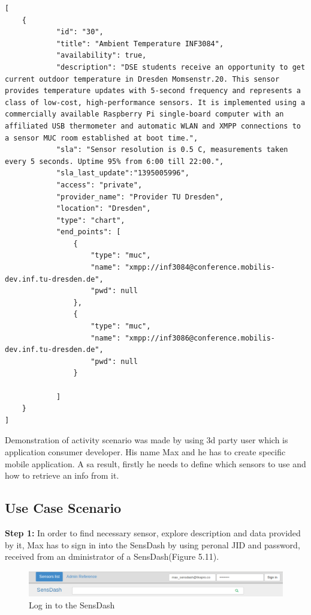 	\begin{lstlisting}[label=sensor_registry,caption=JSON Description Format]
[
    {
            "id": "30",
            "title": "Ambient Temperature INF3084",
            "availability": true,
            "description": "DSE students receive an opportunity to get current outdoor temperature in Dresden Momsenstr.20. This sensor provides temperature updates with 5-second frequency and represents a class of low-cost, high-performance sensors. It is implemented using a commercially available Raspberry Pi single-board computer with an affiliated USB thermometer and automatic WLAN and XMPP connections to a sensor MUC room established at boot time.",
            "sla": "Sensor resolution is 0.5 C, measurements taken every 5 seconds. Uptime 95% from 6:00 till 22:00.",
            "sla_last_update":"1395005996",
            "access": "private",
            "provider_name": "Provider TU Dresden",
            "location": "Dresden",            
            "type": "chart",
            "end_points": [
                {
                    "type": "muc",
                    "name": "xmpp://inf3084@conference.mobilis-dev.inf.tu-dresden.de",
                    "pwd": null
                },
                {
                    "type": "muc",
                    "name": "xmpp://inf3086@conference.mobilis-dev.inf.tu-dresden.de",
                    "pwd": null
                }

            ]
    }
]
	\end{lstlisting}
Demonstration of activity scenario was made by using 3d party user which is application consumer developer. His name Max and he has to create specific mobile application. A sa result, firstly he needs to define which sensors to use and how to retrieve an info from it. 
\subsection{Use Case Scenario}
\label{section:use-case-scenario}

\textbf{Step 1:} In order to find necessary sensor, explore description and data provided by it, Max has to sign in into the SensDash by using peronal JID and password, received from an dministrator of a SensDash(Figure 5.11).
\begin{figure}[!ht]
\centering
\includegraphics[scale=0.6]{Screenshots/signIn.png}   
\caption[Log in to the SensDash]{Log in to the SensDash}                         
\end{figure}

